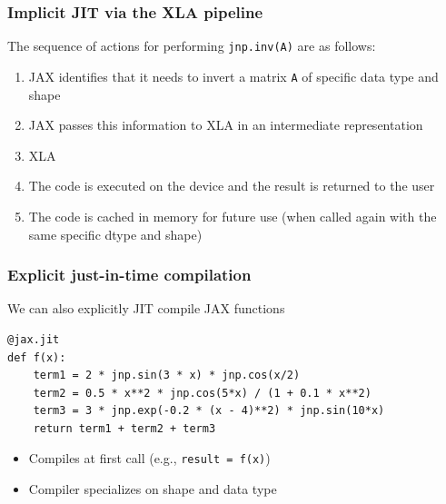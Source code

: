 \begin{frame}[fragile]
    \frametitle{Implicit JIT via the XLA pipeline}

    The sequence of actions for performing \texttt{jnp.inv(A)} are as follows:

    \begin{enumerate}
        \item JAX identifies that it needs to invert a matrix \texttt{A} of
            specific data type and shape
        \vspace{0.5em}
        \item JAX passes this information to XLA in an intermediate
            representation
        \vspace{0.5em}
        \item XLA 
        \vspace{0.5em}
        \item The code is executed on the device and the result is returned to
            the user
        \vspace{0.5em}
        \item The code is cached in memory for future use (when called again
            with the same specific dtype and shape)
    \end{enumerate}

\end{frame}


\begin{frame}[fragile]
    \frametitle{Explicit just-in-time compilation}

    We can also explicitly JIT compile JAX functions
    
    \begin{verbatim}
@jax.jit
def f(x):
    term1 = 2 * jnp.sin(3 * x) * jnp.cos(x/2)
    term2 = 0.5 * x**2 * jnp.cos(5*x) / (1 + 0.1 * x**2)
    term3 = 3 * jnp.exp(-0.2 * (x - 4)**2) * jnp.sin(10*x)
    return term1 + term2 + term3 
    \end{verbatim}

    \vspace{0.5em}
    \vspace{0.5em}

    \begin{itemize}
        \item Compiles at first call (e.g., \texttt{result = f(x)})
        \item Compiler specializes on  shape and data type
    \end{itemize}

\end{frame}



